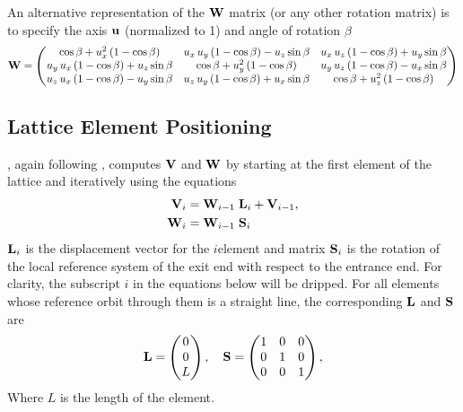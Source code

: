An alternative representation of the ${\bf W}$ matrix (or any other rotation matrix) is to specify the
axis ${\bf u}$ (normalized to 1) and angle of rotation $\beta$
\begin{equation}
  {\bf W} = \begin{pmatrix}
    \cos \beta + u_x^2 \left(1 - \cos \beta \right) & 
    u_x \, u_y \left(1 - \cos \beta \right) - u_z \sin \beta & 
    u_x \, u_z \left(1 - \cos \beta \right) + u_y \sin \beta \\ 
    u_y \, u_x \left(1 - \cos \beta \right) + u_z \sin \beta & 
    \cos \beta + u_y^2\left(1 - \cos \beta \right) & 
    u_y \, u_z \left(1 - \cos \beta \right) - u_x \sin \beta \\ 
    u_z \, u_x \left(1 - \cos \beta \right) - u_y \sin \beta & 
    u_z \, u_y \left(1 - \cos \beta \right) + u_x \sin \beta & 
    \cos \beta + u_z^2\left(1 - \cos \beta \right)
  \end{pmatrix}
  \label{wctux2}
\end{equation}

\subsection{Lattice Element Positioning}
\label{s:ele.pos}

\bmad, again following \mad, computes ${\bf V}$ and ${\bf W}$ by starting at the first element of the
lattice and iteratively using the equations
\begin{align}
  {\bf V}_i &= {\bf W}_{i-1} \; {\bf L}_i + {\bf V}_{i-1}, 
    \label{vwlv} \\
  {\bf W}_i &= {\bf W}_{i-1} \; {\bf S}_i
    \label{wws}
\end{align}
${\bf L}_i$ is the displacement vector for the $i$\Th element and matrix ${\bf S}_i$ is the rotation of
the local reference system of the exit end with respect to the entrance end. For clarity, the
subscript $i$ in the equations below will be dripped. For all elements whose reference orbit through
them is a straight line, the corresponding ${\bf L}$ and ${\bf S}$ are
\begin{equation}
  {\bf L} = 
  \begin{pmatrix}
      0 \\ 0 \\ L
  \end{pmatrix},
  \quad
  {\bf S} = 
  \begin{pmatrix}
      1 & 0 & 0 \\ 
      0 & 1 & 0 \\
      0 & 0 & 1
  \end{pmatrix},
  \label{l00l}
\end{equation}
Where $L$ is the length of the element. 


